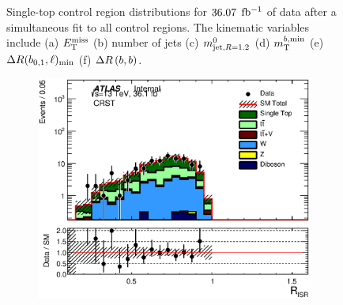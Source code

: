 \begin{figure}[h!]
\begin{center}
\end{center}
\caption[~Single-top control region distributions for $\intlumi$ $\ifb$ of data after a simultaneous fit to all control regions]{Single-top control region distributions for $\intlumi$ $\ifb$ of data after a simultaneous fit to all control regions. The kinematic variables include (a) $E_{\mathrm{T}}^{\mathrm{miss}}$ (b) number of jets (c) $m^{0}_{\mathrm{jet,}R=1.2}$ (d) $m_{\mathrm{T}}^{b,\mathrm{min}}$ (e) $\Delta R(b_{0,1},\ell)_{\mathrm{min}}$ (f) $\Delta R\left(b,b\right)$. }%
\label{fig:CRST}
\end{figure}

\pagebreak

\begin{figure}[h!]
  \begin{center}
      \begin{subfigure}[b]{0.40\textwidth}    
    	 \includegraphics[width=\textwidth]{figures/plotRegion/CA_RISR_CRST_log.eps}
                \caption{ }
    \end{subfigure}
        \begin{subfigure}[b]{0.40\textwidth}    

\end{subfigure}
\end{center}
\end{figure}
